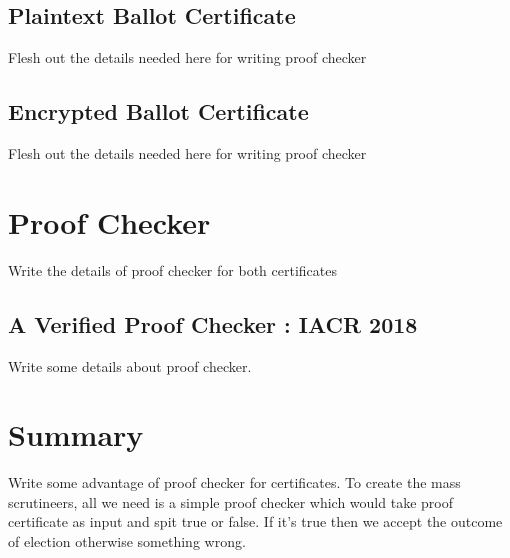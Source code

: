    \subsection{Plaintext Ballot Certificate}
    Flesh out the details needed here for writing proof checker
    
    \subsection{Encrypted Ballot Certificate}
    Flesh out the details needed here for writing proof checker
    
   
\section{Proof Checker}
  Write the details of proof checker for both certificates
  
  	\subsection{A Verified Proof Checker : IACR 2018}
  	Write some details about proof checker.
  
\section{Summary}
   Write some advantage of proof checker for certificates.
   To create the mass scrutineers, all we need is a simple proof checker
   which would take proof certificate as input and spit true or false.
   If it's true then we accept the outcome of election otherwise something 
   wrong.